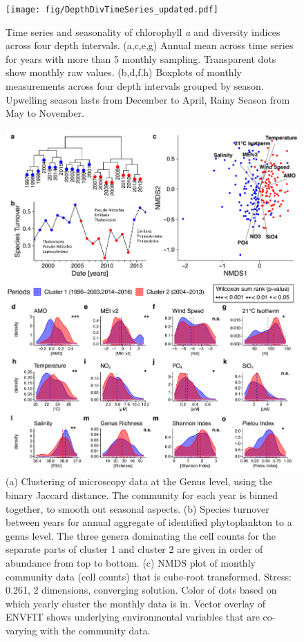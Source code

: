 \documentclass[draft]{agujournal2019}
\begin{document}
\begin{figure}
\begin{center}
\noindent\texttt{[image: fig/DepthDivTimeSeries\_updated.pdf]}
\end{center}
\caption{Time series and seasonality of chlorophyll \textit{a} and diversity indices across four depth intervals. (a,c,e,g) Annual mean across time series for years with more than 5 monthly sampling. Transparent dots show monthly raw values. (b,d,f,h) Boxplots of monthly measurements across four depth intervals grouped by season. Upwelling season lasts from December to April, Rainy Season from May to November.}
\label{fig:divts}
\end{figure}



\begin{figure}
\noindent\includegraphics[width=\textwidth]{fig/ClusteringCompPlot_NEW 2.pdf}
\caption{(a) Clustering of microscopy data at the Genus level, using the binary Jaccard distance. The community for each year is binned together, to smooth out seasonal aspects. (b) Species turnover between years for annual aggregate of identified phytoplankton to a genus level. The three genera dominating the cell counts for the separate parts of cluster 1 and cluster 2 are given in order of abundance from top to bottom. (c) NMDS plot of monthly community data (cell counts) that is cube-root transformed. Stress: 0.261, 2 dimensions, converging solution. Color of dots based on which yearly cluster the monthly data is in. Vector overlay of ENVFIT shows underlying environmental variables that are co-varying with the community data.
}
\end{figure}
\end{document}
